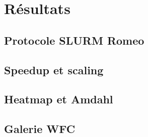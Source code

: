\documentclass[aspectratio=169,11pt]{beamer}
\begin{document}
\section{Résultats}
\subsection{Protocole SLURM Romeo}
\subsection{Speedup et scaling}
\subsection{Heatmap et Amdahl}
\subsection{Galerie WFC}
\end{document}
